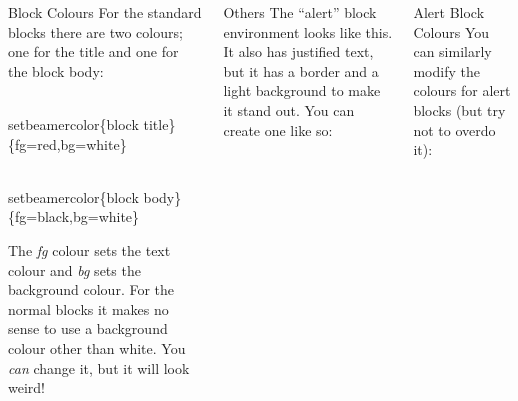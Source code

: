\documentclass[final]{beamer}
\newlength{\onecolwid}
\newlength{\threecolwid}
\begin{document}
\begin{frame}[t]
\begin{columns}[t]
\begin{column}{\threecolwid}
\begin{columns}[t,totalwidth=\threecolwid]
\begin{column}{\onecolwid}
          \begin{block}{Block Colours}
            For the standard blocks there are two colours; one for the title and one for the block body:\\
            \begin{semiverbatim}
              {\color{red}\\setbeamercolor}\{block title\}\newline \{fg=red,bg=white\}
            \end{semiverbatim}
            \begin{semiverbatim}
              {\color{red}\\setbeamercolor}\{block  body\}\newline \{fg=black,bg=white\}
            \end{semiverbatim}
            The \emph{fg} colour sets the text colour and \emph{bg} sets the background colour.
            For the normal blocks it makes no sense to use a background colour other than white. You \emph{can} change it, but it will look weird!
          \end{block}
        \end{column}
\begin{column}{\onecolwid}
      \begin{alertblock}{Others}
        The ``alert'' block environment looks like this. It also has justified text, but it has a border and a light background to make it stand out. You can create one like so:
      \end{alertblock}
        \end{column}
        \begin{column}{\onecolwid}
          \begin{alertblock}{Alert Block Colours}
            You can similarly modify the colours for alert blocks (but try not to overdo it):\\

\end{alertblock}
\end{column}
\end{columns}
\end{column}
\end{columns}
\end{frame}
\end{document}
